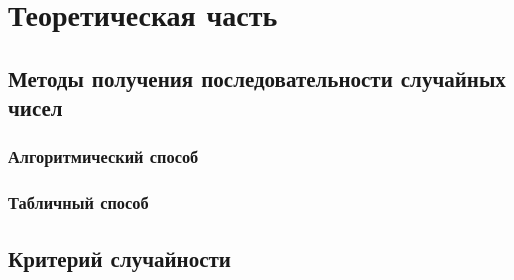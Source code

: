 \chapter{Теоретическая часть}

\section{Методы получения последовательности случайных чисел}


\subsection{Алгоритмический способ}


\subsection{Табличный способ}


\section{Критерий случайности}


